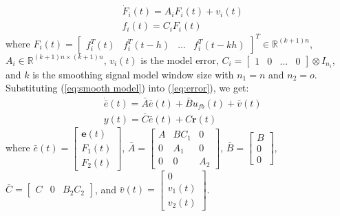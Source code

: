 \documentclass{ieeeaccess}
\newtheorem{remark}{Remark}
\begin{document}
\begin{equation} \label{eq:smooth model}
    \begin{split}
        & \dot{F}_i(t)=A_iF_i(t)+v_i(t) \\
        & f_i(t)=C_iF_i(t)        
    \end{split}
\end{equation}
where $F_i(t)=\begin{bmatrix}
    f_i^T(t) & f_i^T(t-h) & \dots & f_i^T(t-kh)
\end{bmatrix}^T\in\mathbb{R}^{(k+1)n}$, $A_i\in\mathbb{R}^{{(k+1)n}\times{(k+1)n}}$, $v_i(t)$ is the model error, $C_i=\begin{bmatrix}
        1 & 0 & \dots & 0
    \end{bmatrix}\otimes I_{n_i}$, and $k$ is the smoothing signal model window size with $n_1=n$ and $n_2 = o$. Substituting (\ref{eq:smooth model}) into (\ref{eq:error}), we get:
\begin{equation} \label{eq:e_bar}
    \begin{split}
        & \dot{\bar{e}}(t) = \bar{A}\bar{e}(t)+\bar{B}u_{fb}(t)+\bar{v}(t) \\
        & y(t)=\bar{C}\bar{e}(t) + C\pmb{r}(t)
    \end{split}
\end{equation}
where $\bar{e}(t) = \begin{bmatrix}
    \pmb{e}(t) \\ F_1(t) \\ F_2(t)
\end{bmatrix}$, $\bar{A}=\begin{bmatrix}
    A & BC_1 & 0 \\
    0 & A_1 & 0 \\
    0 & 0 & A_2
\end{bmatrix}$, $\bar{B}=\begin{bmatrix}
    B \\ 0 \\ 0
\end{bmatrix}$, $\bar{C}=\begin{bmatrix}
    C & 0 & B_2C_2
\end{bmatrix}$, and $\bar{v}(t)=\begin{bmatrix}
    0 \\ v_1(t) \\ v_2(t)
\end{bmatrix}$.
\end{document}
